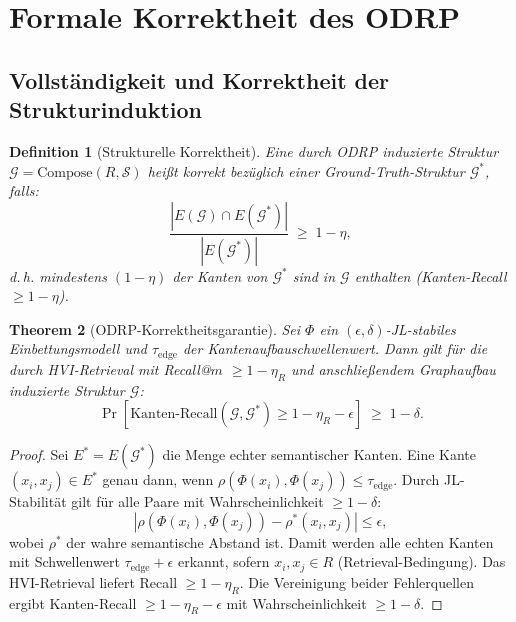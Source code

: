 ﻿\documentclass[12pt,a4paper]{article}
\newtheorem{theorem}{Theorem}[section]
\newtheorem{definition}[theorem]{Definition}
\begin{document}
\section{Formale Korrektheit des ODRP}
\label{sec:korrektheit}

\subsection{Vollständigkeit und Korrektheit der Strukturinduktion}

\begin{definition}[Strukturelle Korrektheit]
\label{def:korrektheit}
Eine durch ODRP induzierte Struktur $\mathcal{G} = \text{Compose}(R, \mathcal{S})$
heißt \emph{korrekt} bezüglich einer Ground-Truth-Struktur
$\mathcal{G}^*$, falls:
\[
  \frac{|E(\mathcal{G}) \cap E(\mathcal{G}^*)|}
       {|E(\mathcal{G}^*)|} \;\geq\; 1 - \eta,
\]
d.\,h. mindestens $(1-\eta)$ der Kanten von $\mathcal{G}^*$
sind in $\mathcal{G}$ enthalten (Kanten-Recall $\geq 1-\eta$).
\end{definition}

\begin{theorem}[ODRP-Korrektheitsgarantie]
\label{thm:correctness}
Sei $\Phi$ ein $(\epsilon, \delta)$-JL-stabiles Einbettungsmo\-dell
und $\tau_{\text{edge}}$ der Kantenaufbauschwellenwert. Dann gilt
für die durch HVI-Retrieval mit Recall@$m$ $\geq 1-\eta_R$ und
anschließendem Graphaufbau induzierte Struktur $\mathcal{G}$:
\[
  \Pr\!\left[\text{Kanten-Recall}(\mathcal{G}, \mathcal{G}^*)
  \geq 1 - \eta_R - \epsilon\right] \;\geq\; 1 - \delta.
\]
\end{theorem}

\begin{proof}
Sei $E^* = E(\mathcal{G}^*)$ die Menge echter semantischer Kanten.
Eine Kante $(x_i, x_j) \in E^*$ genau dann, wenn
$\rho(\Phi(x_i), \Phi(x_j)) \leq \tau_{\text{edge}}$.
Durch JL-Stabilität gilt für alle Paare mit Wahrscheinlichkeit
$\geq 1-\delta$:
\[
  \left|\rho(\Phi(x_i),\Phi(x_j)) - \rho^*(x_i, x_j)\right| \leq \epsilon,
\]
wobei $\rho^*$ der wahre semantische Abstand ist. Damit werden
alle echten Kanten mit Schwellenwert $\tau_{\text{edge}}+\epsilon$
erkannt, sofern $x_i, x_j \in R$ (Retrieval-Bedingung). Das
HVI-Retrieval liefert Recall $\geq 1-\eta_R$. Die Vereinigung beider
Fehlerquellen ergibt Kanten-Recall $\geq 1 - \eta_R - \epsilon$
mit Wahrscheinlichkeit $\geq 1-\delta$.
\end{proof}
\end{document}
